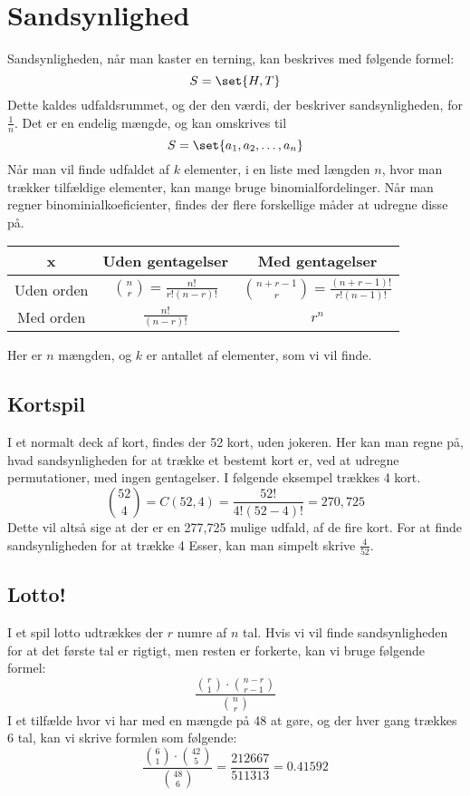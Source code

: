 \section{Sandsynlighed}

Sandsynligheden, når man kaster en terning, kan beskrives med følgende formel:
\begin{equation}
	S=\set{H,T}
\end{equation}
Dette kaldes udfaldsrummet, og der den værdi, der beskriver sandsynligheden, for $\frac{1}{n}$. Det er en endelig mængde, og kan omskrives til 
\begin{equation}
    S=\set{a_1,a_2,\dots,a_n}
\end{equation}
Når man vil finde udfaldet af $k$ elementer, i en liste med længden $n$, hvor man trækker tilfældige elementer, kan mange bruge binomialfordelinger. Når man regner binominialkoeficienter, findes der flere forskellige måder at udregne disse på. 

\begin{table}[h!]
	\centering
	\begin{tabular}{c|c|c}
		x & Uden gentagelser & Med gentagelser \\\hline
		Uden orden & $\binom{n}{r}=\frac{n!}{r!(n-r)!}$ & $\binom{n+r-1}{r}=\frac{(n+r-1)!}{r!(n-1)!}$ \\\hline
		Med orden & $\frac{n!}{(n-r)!}$ & $r^n$
	\end{tabular}
\end{table}
Her er $n$ mængden, og $k$ er antallet af elementer, som vi vil finde.

\subsection{Kortspil}
I et normalt deck af kort, findes der 52 kort, uden jokeren. Her kan man regne på, hvad sandsynligheden for at trække et bestemt kort er, ved at udregne permutationer, med ingen gentagelser. I følgende eksempel trækkes 4 kort.
\begin{equation}
	\binom{52}{4}=C(52,4)=\frac{52!}{4!(52-4)!}=270,725
\end{equation}
Dette vil altså sige at der er en 277,725 mulige udfald, af de fire kort.
For at finde sandsynligheden for at trække 4 Esser, kan man simpelt skrive $\frac{4}{52}$.

\subsection{Lotto!}
I et spil lotto udtrækkes der $r$ numre af $n$ tal. Hvis vi vil finde sandsynligheden for at det første tal er rigtigt, men resten er forkerte, kan vi bruge følgende formel:
\begin{equation}
	\frac{\binom{r}{1}\cdot\binom{n-r}{r-1}}{\binom{n}{r}}
\end{equation}
I et tilfælde hvor vi har med en mængde på 48 at gøre, og der hver gang trækkes 6 tal, kan vi skrive formlen som følgende:
\begin{equation}
	\frac{\binom{6}{1}\cdot\binom{42}{5}}{\binom{48}{6}}=\frac{212667}{511313}=0.41592
\end{equation}

